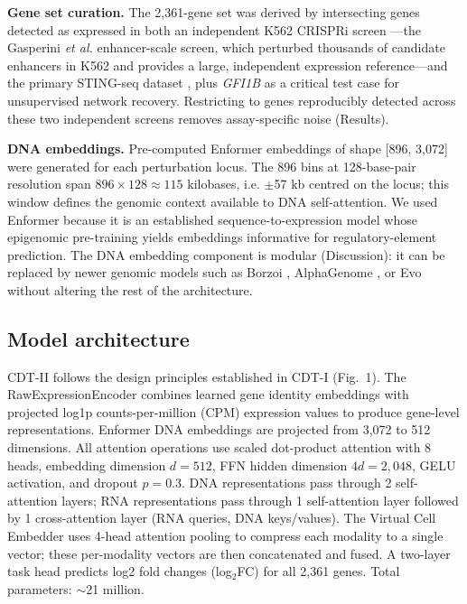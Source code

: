 \documentclass[12pt,a4paper]{article}
\begin{document}
\textbf{Gene set curation.} The 2,361-gene set was derived by intersecting genes detected as expressed in both an independent K562 CRISPRi screen \citep{gasperini2019}---the Gasperini \textit{et al.} enhancer-scale screen, which perturbed thousands of candidate enhancers in K562 and provides a large, independent expression reference---and the primary STING-seq dataset \citep{morris2023}, plus \textit{GFI1B} as a critical test case for unsupervised network recovery. Restricting to genes reproducibly detected across these two independent screens removes assay-specific noise (Results).

\textbf{DNA embeddings.} Pre-computed Enformer \citep{avsec2021enformer} embeddings of shape [896, 3,072] were generated for each perturbation locus. The 896 bins at 128-base-pair resolution span $896 \times 128 \approx 115$ kilobases, i.e. $\pm$57 kb centred on the locus; this window defines the genomic context available to DNA self-attention. We used Enformer because it is an established sequence-to-expression model whose epigenomic pre-training yields embeddings informative for regulatory-element prediction. The DNA embedding component is modular (Discussion): it can be replaced by newer genomic models such as Borzoi \citep{linder2025borzoi}, AlphaGenome \citep{avsec2026alphagen}, or Evo \citep{nguyen2024} without altering the rest of the architecture.

\subsection{Model architecture}

CDT-II follows the design principles established in CDT-I \citep{ota2026cdtv1} (Fig.~1). The RawExpressionEncoder combines learned gene identity embeddings with projected log1p counts-per-million (CPM) expression values to produce gene-level representations. Enformer DNA embeddings are projected from 3,072 to 512 dimensions. All attention operations use scaled dot-product attention \citep{vaswani2017} with 8 heads, embedding dimension $d = 512$, FFN hidden dimension $4d = 2{,}048$, GELU activation, and dropout $p = 0.3$. DNA representations pass through 2 self-attention layers; RNA representations pass through 1 self-attention layer followed by 1 cross-attention layer (RNA queries, DNA keys/values). The Virtual Cell Embedder \citep{ota2026cdtv1} uses 4-head attention pooling to compress each modality to a single vector; these per-modality vectors are then concatenated and fused. A two-layer task head predicts log2 fold changes (log$_2$FC) for all 2,361 genes. Total parameters: $\sim$21 million.
\end{document}
